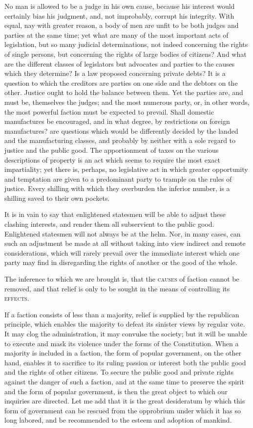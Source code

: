 No man is allowed to be a judge in his own cause, because his interest would certainly bias his judgment, and, not improbably, corrupt his integrity. 
With equal, nay with greater reason, a body of men are unfit to be both judges and parties at the same time; yet what are many of the most important acts of legislation, but so many judicial determinations, not indeed concerning the rights of single persons, but concerning the rights of large bodies of citizens? 
And what are the different classes of legislators but advocates and parties to the causes which they determine? 
Is a law proposed concerning private debts? 
It is a question to which the creditors are parties on one side and the debtors on the other. 
Justice ought to hold the balance between them. 
Yet the parties are, and must be, themselves the judges; and the most numerous party, or, in other words, the most powerful faction must be expected to prevail. 
Shall domestic manufactures be encouraged, and in what degree, by restrictions on foreign manufactures? 
are questions which would be differently decided by the landed and the manufacturing classes, and probably by neither with a sole regard to justice and the public good. 
The apportionment of taxes on the various descriptions of property is an act which seems to require the most exact impartiality; yet there is, perhaps, no legislative act in which greater opportunity and temptation are given to a predominant party to trample on the rules of justice. 
Every shilling with which they overburden the inferior number, is a shilling saved to their own pockets.

It is in vain to say that enlightened statesmen will be able to adjust these clashing interests, and render them all subservient to the public good. 
Enlightened statesmen will not always be at the helm. 
Nor, in many cases, can such an adjustment be made at all without taking into view indirect and remote considerations, which will rarely prevail over the immediate interest which one party may find in disregarding the rights of another or the good of the whole.

The inference to which we are brought is, that the \textsc{causes} of faction cannot be removed, and that relief is only to be sought in the means of controlling its \textsc{effects}.

If a faction consists of less than a majority, relief is supplied by the republican principle, which enables the majority to defeat its sinister views by regular vote. 
It may clog the administration, it may convulse the society; but it will be unable to execute and mask its violence under the forms of the Constitution. 
When a majority is included in a faction, the form of popular government, on the other hand, enables it to sacrifice to its ruling passion or interest both the public good and the rights of other citizens. 
To secure the public good and private rights against the danger of such a faction, and at the same time to preserve the spirit and the form of popular government, is then the great object to which our inquiries are directed. 
Let me add that it is the great desideratum by which this form of government can be rescued from the opprobrium under which it has so long labored, and be recommended to the esteem and adoption of mankind.

